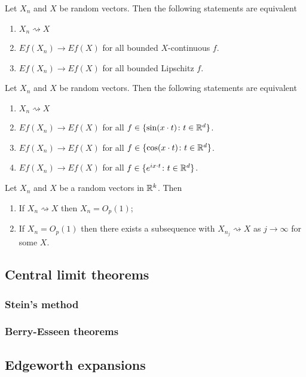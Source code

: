 \begin{shaded}



\begin{theorem}
Let $X_n$ and $X$ be random vectors. 
Then the following statements are equivalent
\begin{enumerate}
\item  $X_n\rightsquigarrow X $
\item  $ E f(X_n) \rightarrow E f(X)$ for all  bounded $X$-continuous $f$.
\item  $ E f(X_n) \rightarrow E f(X)$ for all  bounded Lipschitz $f$.
\end{enumerate}
\end{theorem}


\begin{theorem}[{\bf Portmanteau IV}]
Let $X_n$ and $X$ be random vectors. 
Then the following statements are equivalent
\begin{enumerate}
\item  $X_n\rightsquigarrow X $
\item  $ E f(X_n) \rightarrow E f(X)$ for all $f\in \{\sin(x\cdot t)\colon t\in\Bbb R^d \}$.
\item  $ E f(X_n) \rightarrow E f(X)$ for all $f\in \{\cos(x\cdot t)\colon t\in\Bbb R^d \}$.
\item  $ E f(X_n) \rightarrow E f(X)$ for all $f\in \{e^{i x\cdot t}\colon t\in\Bbb R^d \}$.
\end{enumerate}
\end{theorem}



\begin{theorem}
Let $X_n$ and $X$ be a random vectors in $\Bbb R^k$. Then
\begin{enumerate}
\item If $X_n\rightsquigarrow X$ then $X_n = O_p(1)$;
\item If $X_n = O_p(1)$ then there exists a subsequence with $X_{n_j}\rightsquigarrow X$ as $j\rightarrow \infty$ for some $X$.
\end{enumerate}
\end{theorem}




\subsection{Central limit theorems}
\subsubsection{Stein's method}
\subsubsection{Berry-Esseen theorems}


\subsection{Edgeworth expansions}
\end{shaded}


